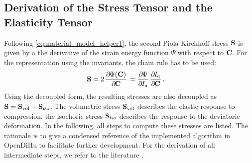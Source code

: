 \subsection{Derivation of the Stress Tensor and the Elasticity Tensor}\label{sec:stress_and_elasticity}
Following \cref{eq:material_model_helper1}, the second Piola-Kirchhoff stress $\textbf{S}$ is given by a the derivative of the strain energy function $\Psi$ with respect to $\textbf{C}$.
For the representation using the invariants, the chain rule has to be used:%
\begin{align*}
   \bfS &= 2\,\p{\Psi(\bfC)}{\bfC} = \p{\Psi}{I_a}\p{I_a}{\bfC}.
\end{align*}
Using the decoupled form, the resulting stresses are also decoupled as $\textbf{S} = \textbf{S}_\text{vol}+\textbf{S}_\text{iso}$. The volumetric stress $\textbf{S}_\text{vol}$ describes the elastic response to compression, the isochoric stress $\textbf{S}_\text{iso}$ describes the response to the deviatoric deformation. In the following, all steps to compute these stresses are listed. The rationale is to give a condensed reference of the implemented algorithm in OpenDiHu to facilitate further development.
For the derivation of all intermediate steps, we refer to the literature \cite{holzapfel2000nonlinear}.

